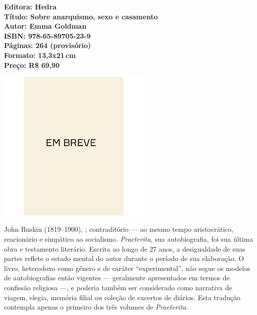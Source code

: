 \vfill
\noindent\begin{minipage}[c]{.5\linewidth}
{\small\textbf{
\hspace*{-.1cm}Editora: Hedra\\
Título: Sobre anarquismo, sexo e casamento\\
Autor: Emma Goldman\\ 
ISBN: 978-65-89705-23-9\\
Páginas: 264 (provisório)\\
Formato: 13,3x21\,cm\\
Preço: R\$ 69,90\\
}}
\end{minipage}
\pagebreak

\begin{center}
\hspace*{-3.6cm}
\hspace*{3.1cm}\includegraphics[width=74mm]{./CAPAS/breve.jpeg}
\end{center}
\hspace*{-7cm}\hrulefill\hspace*{-7cm}
\medskip

\noindent{}John Ruskin (1819--1900), ; contraditório --- ao mesmo tempo aristocrático, reacionário e simpático ao socialismo. \textit{Praeterita}, sua autobiografia, foi sua última obra e testamento literário. Escrita ao longo de 27 anos, a desigualdade de suas partes reflete o estado mental do autor durante o período de sua elaboração. O livro, heterodoxo como gênero e de caráter ``experimental'', não segue os modelos de autobiografias então vigentes --- geralmente apresentados em termos de confissão religiosa ---, e poderia também ser considerado como narrativa de viagem, elegia, memória filial ou coleção de excertos de diários. Esta tradução contempla apenas o primeiro dos três volumes de \textit{Praeterita}.

